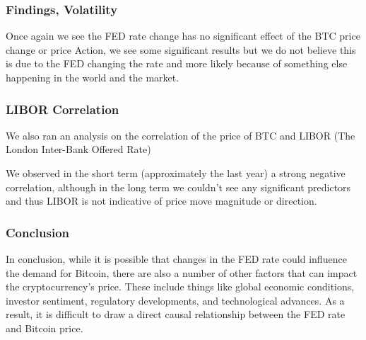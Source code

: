\documentclass{beamer}
\begin{document}
\begin{frame}
    \frametitle{Findings, Volatility}
Once again we see the FED rate change has no significant effect of the BTC price change or price Action, we see some significant results but we do not believe this is due to the FED changing the rate and more likely because of something else happening in the world and the market.
\end{frame}

\begin{frame}
    \frametitle{LIBOR Correlation}
    We also ran an analysis on the correlation of the price of BTC and LIBOR (The London Inter-Bank Offered Rate)\newline
    
We observed in the short term (approximately the last year) a strong negative correlation, although in the long term we couldn't see any significant predictors and thus LIBOR is not indicative of price move magnitude or direction.
\end{frame}

\begin{frame}
    \frametitle{Conclusion}
    In conclusion, while it is possible that changes in the FED rate could influence the demand for Bitcoin, there are also a number of other factors that can impact the cryptocurrency's price. These include things like global economic conditions, investor sentiment, regulatory developments, and technological advances. As a result, it is difficult to draw a direct causal relationship between the FED rate and Bitcoin price.
\end{frame}
\end{document}
